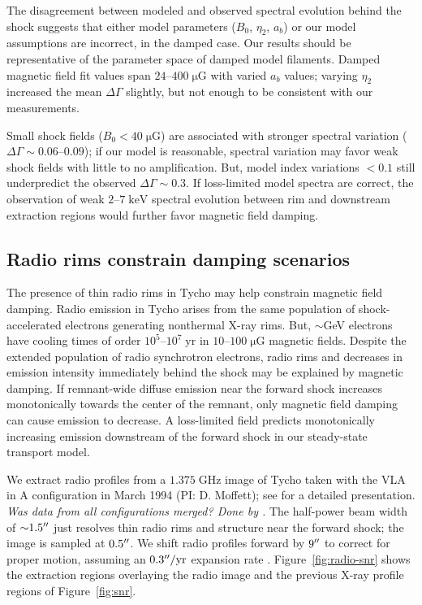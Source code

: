 \documentclass[iop, apj, numberedappendix]{emulateapj}
\newcommand*{\mt}{\mathrm}
\newcommand*{\unit}[1]{\;\mt{#1}}  %
\newcommand*{\abt}{\mathord{\sim}} %
\newcommand*{\muG}{\unit{\mu G}}
\begin{document}
The disagreement between modeled and observed spectral evolution behind the
shock suggests that either model parameters ($B_0$, $\eta_2$, $a_b$) or our
model assumptions are incorrect, in the damped case.
Our results should be representative of the parameter space of damped model
filaments.  Damped magnetic field fit values span $24$--$400 \muG$ with varied
$a_b$ values; varying $\eta_2$ increased the mean $\Delta\Gamma$ slightly, but
not enough to be consistent with our measurements.

Small shock fields ($B_0 < 40 \muG$) are associated with stronger spectral
variation ($\Delta\Gamma \sim 0.06$--$0.09$); if our model is reasonable,
spectral variation may favor weak shock fields with little to no amplification.
But, model index variations $<0.1$ still underpredict the observed
$\Delta\Gamma \sim 0.3$.  If loss-limited model spectra are correct, the
observation of weak $2$--$7 \unit{keV}$ spectral evolution between rim and
downstream extraction regions would further favor magnetic field damping.

\subsection{Radio rims constrain damping scenarios}

The presence of thin radio rims in Tycho may help constrain magnetic field
damping.  Radio emission in Tycho arises from the same population of
shock-accelerated electrons generating nonthermal X-ray rims.  But, $\abt$GeV
electrons have cooling times of order $10^5$--$10^7 \unit{yr}$ in $10$--$100
\muG$ magnetic fields.  Despite the extended population of radio synchrotron
electrons, radio rims and decreases in emission intensity immediately behind
the shock may be explained by magnetic damping.  If remnant-wide diffuse
emission near the forward shock increases monotonically towards the center of
the remnant, only magnetic field damping can cause emission to decrease.  A
loss-limited field predicts monotonically increasing emission downstream of the
forward shock in our steady-state transport model.

We extract radio profiles from a $1.375 \unit{GHz}$ image of Tycho taken
with the VLA in A configuration in March 1994 (PI: D. Moffett); see
\citet{reynoso1997} for a detailed presentation.
\emph{Was data from all configurations merged?  Done by \citet{reynoso1997}.}
The half-power beam width of $\abt 1.5\arcsec$ just resolves thin radio rims
and structure near the forward shock; the image is sampled at $0.5\mbox{$^{\prime\prime}$}$.  We
shift radio profiles forward by $9\mbox{$^{\prime\prime}$}$ to correct for proper motion,
assuming an $0.3\arcsec/\mt{yr}$ expansion rate \citep{katsuda2010-tycho}.
Figure~\ref{fig:radio-snr} shows the extraction regions overlaying the radio
image and the previous X-ray profile regions of Figure~\ref{fig:snr}.
\end{document}
